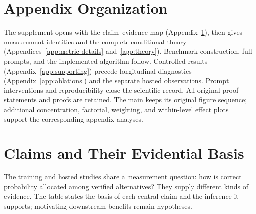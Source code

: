 \documentclass{article}
\newcommand{\1}{\mathbf 1}
\theoremstyle{remark}
\theoremstyle{definition}
\theoremstyle{plain}
\begin{document}
\section*{Appendix Organization}
\label{app:organization}
The supplement opens with the claim--evidence map
(Appendix~\ref{app:claim-basis}), then gives measurement identities and the
complete conditional theory (Appendices~\ref{app:metric-details} and~\ref{app:theory}).
Benchmark construction, full prompts, and the implemented algorithm follow.
Controlled results (Appendix~\ref{app:supporting}) precede longitudinal
diagnostics (Appendix~\ref{app:ablations}) and the separate hosted observations.
Prompt interventions and reproducibility close the scientific record.
All original proof statements and proofs are retained. The main keeps its
original figure sequence; additional concentration, factorial, weighting, and
within-level effect plots support the corresponding appendix analyses.

\appendix
\onecolumn
\raggedbottom

\section{Claims and Their Evidential Basis}
\label{app:claim-basis}

The training and hosted studies share a measurement question: how is correct
probability allocated among verified alternatives? They supply different
kinds of evidence. The table states the basis of each central claim and the
inference it supports; motivating downstream benefits remain hypotheses.
\end{document}
